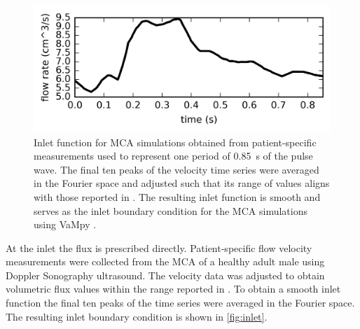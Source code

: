 \documentclass[a4paper,titlepage]{scrartcl}
\begin{document}
\begin{figure}
\centerline{\includegraphics{figures/inlet.png}}
\caption{Inlet function for MCA simulations obtained from patient-specific measurements used to represent one period of \SI{0.85}{\second} of the pulse wave. The final ten peaks of the velocity time series were averaged in the Fourier space and adjusted such that its range of values aligns with those reported in \cite{Olufsen2002}. The resulting inlet function is smooth and serves as the inlet boundary condition for the MCA simulations using VaMpy \cite{Diem2016a}.\label{fig:inlet}}
\end{figure}

At the inlet the flux is prescribed directly. Patient-specific flow velocity measurements were collected from the MCA of a healthy adult male using Doppler Sonography ultrasound. The velocity data was adjusted to obtain volumetric flux values within the range reported in \cite{Olufsen2002}. To obtain a smooth inlet function the final ten peaks of the time series were averaged in the Fourier space. The resulting inlet boundary condition is shown in \autoref{fig:inlet}.
\end{document}
